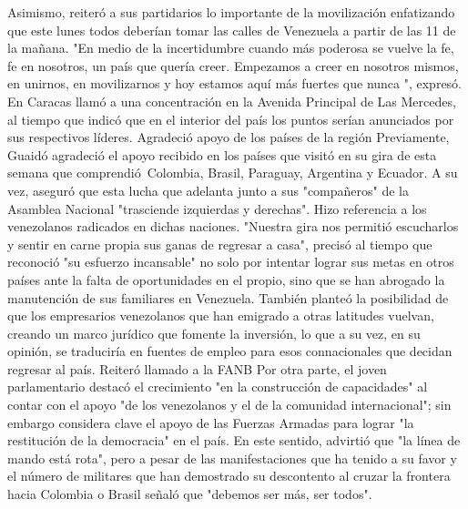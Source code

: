 \documentclass{article}%
\begin{document}
\newline%
%
Asimismo, reiteró a sus partidarios lo importante de la movilización enfatizando que este lunes todos deberían tomar las calles de Venezuela a partir de las 11 de la mañana. "En medio de la incertidumbre cuando más poderosa se vuelve la fe, fe en nosotros, un país que quería creer. Empezamos a creer en nosotros mismos, en unirnos, en movilizarnos y hoy estamos aquí más fuertes que nunca  ", expresó.%
\newline%
%
En Caracas llamó a una concentración en la Avenida Principal de Las Mercedes, al tiempo que indicó que en el interior del país los puntos serían anunciados por sus respectivos líderes.%
\newline%
%
Agradeció apoyo de los países de la región%
\newline%
%
Previamente, Guaidó agradeció el apoyo recibido en los países que visitó en su gira de esta semana que comprendió~Colombia, Brasil, Paraguay, Argentina y Ecuador.%
\newline%
%
A su vez, aseguró que esta lucha que adelanta junto a sus "compañeros" de la Asamblea Nacional "trasciende izquierdas y derechas".%
\newline%
%
Hizo referencia a los venezolanos radicados en dichas naciones. "Nuestra gira nos permitió escucharlos y sentir en carne propia sus ganas de regresar a casa", precisó al tiempo que reconoció "su esfuerzo incansable" no solo por intentar lograr sus metas en otros países ante la falta de oportunidades en el propio, sino que se han abrogado la manutención de sus familiares en Venezuela.%
\newline%
%
También planteó la posibilidad de que los empresarios venezolanos que han emigrado a otras latitudes vuelvan, creando un marco jurídico que fomente la inversión, lo que a su vez, en su opinión, se traduciría en fuentes de empleo para esos connacionales que decidan regresar al país.%
\newline%
%
Reiteró llamado a la FANB%
\newline%
%
Por otra parte, el joven parlamentario destacó el crecimiento "en la construcción de capacidades" al contar con el apoyo "de los venezolanos y el de la comunidad internacional"; sin embargo considera clave el apoyo de las Fuerzas Armadas para lograr "la restitución de la democracia" en el país.%
\newline%
%
En este sentido, advirtió que "la línea de mando está rota", pero a pesar de las manifestaciones que ha tenido a su favor y el número de militares que han demostrado su descontento al cruzar la frontera hacia Colombia o Brasil señaló que "debemos ser más, ser todos".%
\end{document}
